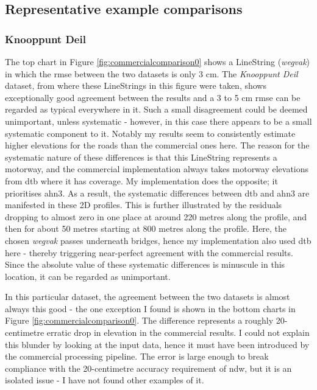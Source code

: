 \subsection{Representative example comparisons}
\label{sub:comparisonexamples}

\subsubsection{Knooppunt Deil}

The top chart in Figure \ref{fig:commercialcomparison0} shows a LineString (\textit{wegvak}) in which the \ac{rmse} between the two datasets is only 3 cm. The \textit{Knooppunt Deil} dataset, from where these LineStrings in this figure were taken, shows exceptionally good agreement between the results and a 3 to 5 cm \ac{rmse} can be regarded as typical everywhere in it. Such a small disagreement could be deemed unimportant, unless systematic - however, in this case there appears to be a small systematic component to it. Notably my results seem to consistently estimate higher elevations for the roads than the commercial ones here. The reason for the systematic nature of these differences is that this LineString represents a motorway, and the commercial implementation always takes motorway elevations from \ac{dtb} where it has coverage. My implementation does the opposite; it prioritises \ac{ahn3}. As a result, the systematic differences between \ac{dtb} and \ac{ahn3} are manifested in these 2D profiles. This is further illustrated by the residuals dropping to almost zero in one place at around 220 metres along the profile, and then for about 50 metres starting at 800 metres along the profile. Here, the chosen \textit{wegvak} passes underneath bridges, hence my implementation also used \ac{dtb} here - thereby triggering near-perfect agreement with the commercial results. Since the absolute value of these systematic differences is minuscule in this location, it can be regarded as unimportant.

In this particular dataset, the agreement between the two datasets is almost always this good - the one exception I found is shown in the bottom charts in Figure \ref{fig:commercialcomparison0}. The difference represents a roughly 20-centimetre erratic drop in elevation in the commercial results. I could not explain this blunder by looking at the input data, hence it must have been introduced by the commercial processing pipeline. The error is large enough to break compliance with the 20-centimetre accuracy requirement of \ac{ndw}, but it is an isolated issue - I have not found other examples of it.

